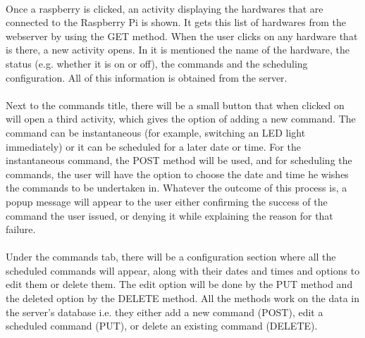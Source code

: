 \documentclass[12pt, oneside, a4paper]{book}
\begin{document}
				\paragraph{}Once a raspberry is clicked, an activity displaying the hardwares that are connected to the Raspberry Pi is shown. It gets this list of hardwares from the webserver by using the GET method. When the user clicks on any  hardware that is there, a new activity opens. In it is mentioned the name of the hardware, the status (e.g. whether it is on or off), the commands and the scheduling configuration. All of this information is obtained from the server. 
				
				\paragraph{}Next to the commands title, there will be a small button that when clicked on will open a third activity, which gives the option of adding a new command. The command can be instantaneous (for example, switching an LED light immediately) or it can be scheduled for a later date or time. For the instantaneous command, the POST method will be used, and for scheduling the commands, the user will have the option to choose the date and time he wishes the commands to be undertaken in. Whatever the outcome of this process is, a popup message will appear to the user either confirming the success of the command the user issued, or denying it while explaining the reason for that failure.
				
				\paragraph{}Under the commands tab, there will be a  configuration 	section where all the scheduled commands will appear, along with their dates and times and options to edit them or delete them. The edit option will be done by the PUT method and the deleted option by the DELETE method. All the methods work on the data in the server’s database i.e. they either add a new command (POST), edit a scheduled command (PUT), or delete an existing command (DELETE). 
				
			
\end{document}
